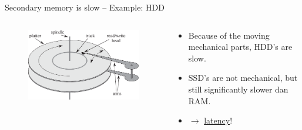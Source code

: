 \documentclass[11pt,t]{beamer}
\begin{document}
	\begin{frame}{Secondary memory is slow -- Example: HDD}
		\begin{columns}
			\begin{column}{.4\textwidth}
				\centering
				\begin{figure}
					\includegraphics[width=\columnwidth]{images/disk}
				\end{figure}
			\end{column}
			\begin{column}{.6\textwidth}
				\begin{itemize}
					\item Because of the moving mechanical parts, HDD's are slow.
					\item SSD's are not mechanical, but still significantly slower dan RAM.
					\pause \item[]\(\rightarrow\) \underline{latency}!
				\end{itemize}
			\end{column}
		\end{columns}
	\end{frame}
\end{document}
